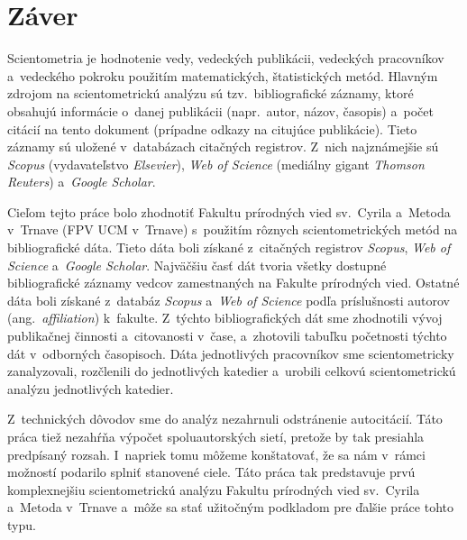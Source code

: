 \chapter*{Záver}

Scientometria je hodnotenie vedy, vedeckých publikácii, vedeckých pracovníkov
a~vedeckého pokroku použitím matematických, štatistických metód.  Hlavným zdrojom
na scientometrickú analýzu sú tzv.~bibliografické záznamy, ktoré obsahujú
informácie o~danej publikácii (napr.~autor, názov, časopis) a~počet citácií na
tento dokument (prípadne odkazy na citujúce publikácie).  Tieto záznamy sú
uložené v~databázach citačných registrov.  Z~nich najznámejšie sú \emph{Scopus}
(vydavateľstvo \emph{Elsevier}), \emph{Web of Science} (mediálny gigant
\emph{Thomson Reuters}) a~\emph{Google Scholar}.

Cieľom tejto práce bolo zhodnotiť Fakultu prírodných vied sv.~Cyrila a~Metoda
v~Trnave (FPV UCM v~Trnave) s~použitím rôznych scientometrických metód na
bibliografické dáta.  Tieto dáta boli získané z~citačných registrov
\emph{Scopus}, \emph{Web of Science} a~\emph{Google Scholar}.  Najväčšiu časť
dát tvoria všetky dostupné bibliografické záznamy vedcov zamestnaných na Fakulte
prírodných vied.  Ostatné dáta boli získané z~databáz \emph{Scopus} a~\emph{Web
  of Science} podľa príslušnosti autorov (ang.~\emph{affiliation}) k~fakulte.
Z~týchto bibliografických dát sme zhodnotili vývoj publikačnej činnosti
a~citovanosti v~čase, a~zhotovili tabuľku početnosti týchto dát v~odborných
časopisoch.  Dáta jednotlivých pracovníkov sme scientometricky zanalyzovali,
rozčlenili do jednotlivých katedier a~urobili celkovú scientometrickú analýzu
jednotlivých katedier.

Z~technických dôvodov sme do analýz nezahrnuli odstránenie autocitácií.  Táto
práca tiež nezahŕňa výpočet spoluautorských sietí, pretože by tak presiahla
predpísaný rozsah.  I~napriek tomu môžeme konštatovať, že sa nám v~rámci
možností podarilo splniť stanovené ciele.  Táto práca tak predstavuje prvú
komplexnejšiu scientometrickú analýzu Fakultu prírodných vied sv.~Cyrila
a~Metoda v~Trnave a~môže sa stať užitočným podkladom pre ďalšie práce tohto typu.

